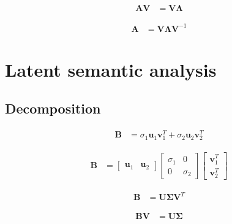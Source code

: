 \documentclass{article}
\begin{document}
\begin{align}
	\mathbf{A}\mathbf{V} & =\mathbf{V}\mathbf{\Lambda}
\end{align}

\begin{align}
	\mathbf{A} & =\mathbf{V}\mathbf{\Lambda}\mathbf{V}^{-1}
\end{align}

\section{Latent semantic analysis}

\subsection{Decomposition}

\begin{align}
	\mathbf{B} & =\sigma_{1}\mathbf{u}_{1}\mathbf{v}_{1}^{T}+\sigma_{2}\mathbf{u}_{2}\mathbf{v}_{2}^{T}
\end{align}

\begin{align}
	\mathbf{B} & =\left[\begin{array}{cc}
		\mathbf{u}_{1} & \mathbf{u}_{2}\end{array}\right]\left[\begin{array}{cc}
		\sigma_{1} & 0\\
		0 & \sigma_{2}
	\end{array}\right]\left[\begin{array}{c}
		\mathbf{v}_{1}^{T}\\
		\mathbf{v}_{2}^{T}
	\end{array}\right]
\end{align}

\begin{align}
	\mathbf{B} & =\mathbf{U}\mathbf{\Sigma}\mathbf{V}^{T}
\end{align}

\begin{align}
	\mathbf{B}\mathbf{V} & =\mathbf{U}\mathbf{\Sigma}
\end{align}



\end{document}
